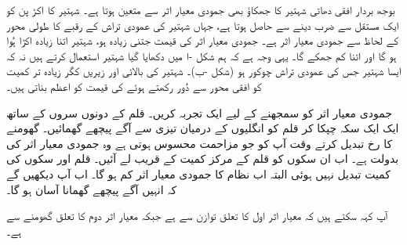 بوجھ بردار افقی  دھاتی شہتیر کا  جھکاؤ بھی جمودی معیار اثر  سے  متعین ہوتا ہے۔ شہتیر کا اکڑ پن   کو  ایک مستقل  سے ضرب دینے  سے حاصل ہوتا ہے، جہاں   شہتیر کی عمودی تراش کے رقبے کا طولی محور کے لحاظ سے جمودی  معیار اثر  ہے۔ جمودی معیار اثر  کی قیمت جتنی زیادہ ہو، شہتیر اتنا زیادہ  اکڑا ہُوا  ہو گا اور اتنا کم جھکے گا۔  یہی وجہ ہے کہ ہم شکل -ا  میں دکھایا گیا   شہتیر استعمال کرتے ہیں نہ  کہ ایسا شہتیر جس کی  عمودی تراش  چوکور ہو (شکل -ب)۔ شہتیر کی بالائی اور زیریں کگر زیادہ تر کمیت کو افقی محور سے دُور رکھتے ہوئے  کی قیمت کو اعظم بناتی ہیں۔

 جمودی معیار اثر  کو سمجھنے کے لیے ایک تجربہ کریں۔  قلم کے دونوں سروں کے ساتھ   ایک ایک سکہ چپکا   کر  قلم کو انگلیوں کے درمیان تیزی سے آگے پیچھے گھمائیں۔  گھومنے کا رخ تبدیل کرتے وقت آپ کو جو مزاحمت محسوس ہوتی ہے وہ جمودی معیار اثر کی بدولت  ہے۔ اب ان سکوں کو  قلم کے مرکز کمیت کے      قریب لے آئیں۔ قلم اور سکوں کی کمیت تبدیل نہیں ہوئی  البتہ  اب  نظام کا جمودی معیار اثر کم ہو گا۔ اب   آپ دیکھیں گے کہ انہیں آگے پیچھے گھمانا  آسان ہو گا۔


آپ کہہ سکتے ہیں کہ  معیار اثر اول  کا تعلق توازن سے ہے جبکہ معیار اثر دوم  کا تعلق گھومنے سے ہے۔

